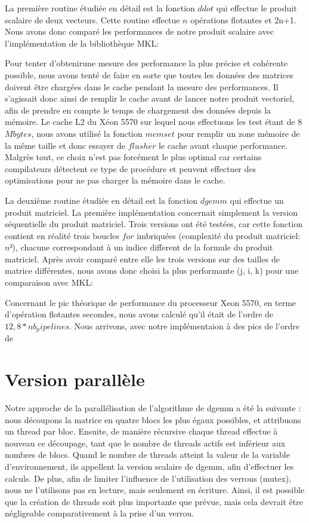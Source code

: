 \documentclass[a4paper,11pt]{article}
\begin{document}
La première routine étudiée en détail est la fonction $ddot$ qui effectue le produit scalaire de deux vecteurs. Cette routine effectue $n$ opérations flotantes et 2n+1. Nous avons donc comparé les performances de notre produit scalaire avec l'implémentation de la bibliothèque MKL:

Pour tenter d'obtenirune mesure des performance la plus précise et cohérente possible, nous avons tenté de faire en sorte que toutes les données des matrices doivent être chargées dans le cache pendant la mesure des performances. Il s'agissait donc ainsi de remplir le cache avant de lancer notre produit vectoriel, afin de prendre en compte le temps de chargement des données depuis la mémoire. Le cache L2 du Xéon 5570 sur lequel nous effectuons les test étant de 8 $Mbytes$, nous avons utilisé la fonction $memset$ pour remplir un zone mémoire de la même taille et donc essayer de $flusher$ le cache avant chaque performance. Malgrès tout, ce choix n'est pas forcément le plus optimal car certains compilateurs détectent ce type de procédure et peuvent effectuer des optimisations pour ne pas charger la mémoire dans le cache.


La deuxième routine étudiée en détail est la fonction $dgemm$ qui effectue un produit matriciel. La première implémentation concernait simplement la version séquentielle du produit matriciel. Trois versions ont été testées, car cette fonction contient en réalité trois boucles $for$ imbriquées (complexité du produit matriciel: $n³$), chacune correspondant à un indice different de la formule du produit matriciel. Après avoir comparé entre elle les trois versions sur des tailles de matrice différentes, nous avons donc choisi la plus performante (j, i, k) pour une comparaison avec MKL:


Concernant le pic théorique de performance du processeur Xeon 5570, en terme d'opération flotantes secondes, nous avons calculé qu'il était de l'ordre de $12,8 * nb_pipelines$. Nous arrivons, avec notre implémentaion à des pics de l'ordre de %

\section{Version parallèle}
Notre approche de la parallélisation de l'algorithme de dgemm a été la suivante : nous découpons la matrice en quatre blocs les plus égaux possibles, et attribuons un thread par bloc.
Ensuite, de manière récursive chaque thread effectue à nouveau ce découpage, tant que le nombre de threads actifs est inférieur aux nombres de blocs. 
Quand le nombre de threads atteint la valeur de la variable d'environnement, ils appellent la version scalaire de dgemm, afin d'effectuer les calculs.
De plus, afin de limiter l'influence de l'utilisation des verrous (mutex), nous ne l'utilisons pas en lecture, mais seulement en écriture. 
Ainsi, il est possible que la création de threads soit plus importante que prévue, mais cela devrait être négligeable comparativement à la prise d'un verrou.
\end{document}
